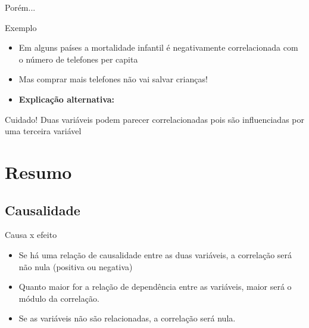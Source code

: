 \documentclass{beamer}
\begin{document}
\begin{frame}{\scriptsize }
  \begin{center}
    Porém...
  \end{center}
\end{frame}

\begin{frame}{\scriptsize }
  \begin{exampleblock}{Exemplo }
    \footnotesize
    \begin{itemize}
      \footnotesize
    \item<1-> Em alguns países a mortalidade infantil é negativamente
      correlacionada com o número de telefones per capita
    \item<2-> Mas comprar mais telefones não vai salvar crianças!
      \bigskip
    \item<2-> {\bf Explicação alternativa:} 
    \end{itemize}    
  \end{exampleblock}
\end{frame}

\begin{frame}{\scriptsize }
  \begin{block}{Cuidado!}
    \footnotesize
    Duas variáveis podem \alert{parecer} correlacionadas pois são
    influenciadas por uma terceira variável
  \end{block}
\end{frame}

\section{Resumo}

\subsection{Causalidade}

\begin{frame}{\scriptsize Causa x efeito}
  \begin{itemize}
    \footnotesize
  \item Se há uma relação de causalidade entre as duas variáveis, a
    correlação será não nula (positiva ou negativa)
    \bigskip
  \item Quanto maior for a relação de dependência entre as variáveis,
    maior será o módulo da correlação.
    \bigskip
  \item Se as variáveis não são relacionadas, a correlação será nula.
  \end{itemize}
\end{frame}
\end{document}
